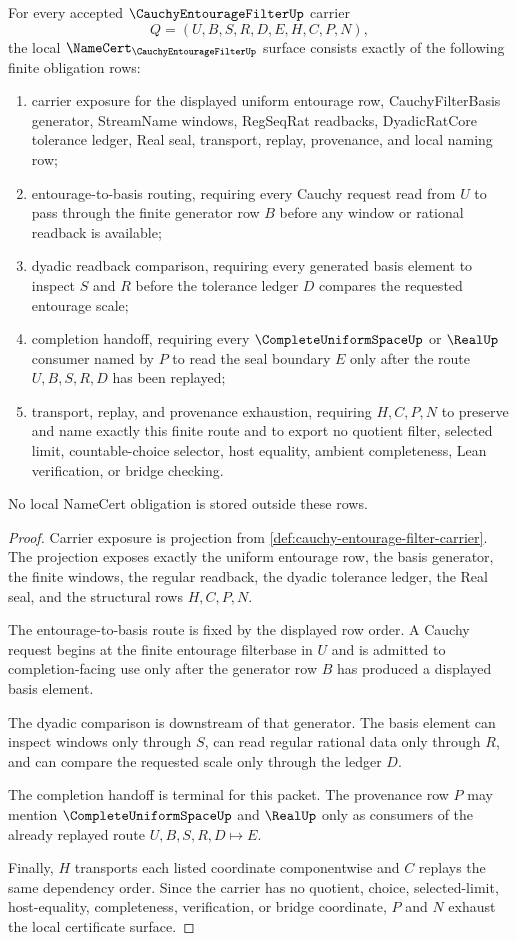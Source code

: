 \begin{theorem}
\label{thm:cauchy-entourage-filter-namecert-obligations}
For every accepted $\CauchyEntourageFilterUp$ carrier
$$
Q=(U,B,S,R,D,E,H,C,P,N),
$$
the local $\NameCert_{\CauchyEntourageFilterUp}$ surface consists exactly of the following finite obligation rows:
\begin{enumerate}
\item carrier exposure for the displayed uniform entourage row, CauchyFilterBasis generator, StreamName windows, RegSeqRat readbacks, DyadicRatCore tolerance ledger, Real seal, transport, replay, provenance, and local naming row;
\item entourage-to-basis routing, requiring every Cauchy request read from $U$ to pass through the finite generator row $B$ before any window or rational readback is available;
\item dyadic readback comparison, requiring every generated basis element to inspect $S$ and $R$ before the tolerance ledger $D$ compares the requested entourage scale;
\item completion handoff, requiring every $\CompleteUniformSpaceUp$ or $\RealUp$ consumer named by $P$ to read the seal boundary $E$ only after the route $U,B,S,R,D$ has been replayed;
\item transport, replay, and provenance exhaustion, requiring $H,C,P,N$ to preserve and name exactly this finite route and to export no quotient filter, selected limit, countable-choice selector, host equality, ambient completeness, Lean verification, or bridge checking.
\end{enumerate}
No local NameCert obligation is stored outside these rows.
\end{theorem}
\begin{proof}
Carrier exposure is projection from \autoref{def:cauchy-entourage-filter-carrier}. The projection exposes exactly the uniform entourage row, the basis generator, the finite windows, the regular readback, the dyadic tolerance ledger, the Real seal, and the structural rows $H,C,P,N$.

The entourage-to-basis route is fixed by the displayed row order. A Cauchy request begins at the finite entourage filterbase in $U$ and is admitted to completion-facing use only after the generator row $B$ has produced a displayed basis element.

The dyadic comparison is downstream of that generator. The basis element can inspect windows only through $S$, can read regular rational data only through $R$, and can compare the requested scale only through the ledger $D$.

The completion handoff is terminal for this packet. The provenance row $P$ may mention $\CompleteUniformSpaceUp$ and $\RealUp$ only as consumers of the already replayed route $U,B,S,R,D\longmapsto E$.

Finally, $H$ transports each listed coordinate componentwise and $C$ replays the same dependency order. Since the carrier has no quotient, choice, selected-limit, host-equality, completeness, verification, or bridge coordinate, $P$ and $N$ exhaust the local certificate surface.
\end{proof}

